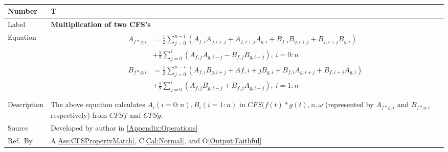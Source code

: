 \documentclass[12pt]{article}
\newcommand{\colAwidth}{0.13\textwidth}
\newcommand{\colBwidth}{0.82\textwidth}
\newcounter{theorynum} %
\newcommand{\aref}[1]{A\ref{#1}}
\newcommand{\calref}[1]{C\ref{#1}}
\newcommand{\oref}[1]{O\ref{#1}}
\begin{document}
~\newline
\noindent
\begin{minipage}{\textwidth}
	\renewcommand*{\arraystretch}{1.5}
	\begin{tabular}{| p{\colAwidth} | p{\colBwidth}|}
		\hline
		\rowcolor[gray]{0.9}
		Number& T{theorynum}\thetheorynum \label{T:Multiplication}\\
		\hline
		Label&\bf Multiplication of two CFS's\\
		\hline
		Equation&  
		\begin{equation}
		\begin{aligned}
		A_{f*g, i}
		&=\frac{1}{2}\sum_{j=0}^{n-i}(A_{f,i}A_{g,i+j}+A_{f, i+j}A_{g, i}+B_{f,i}B_{g,i+j}+B_{f,i+j}B_{g,i})\\&+\frac{1}{2}\sum_{j=0}^{i}(A_{f,j}A_{g,i-j}-B_{f,j}B_{g,i-j}),~i=0:n\\
		B_{f*g, i}
		&=\frac{1}{2}\sum_{j=0}^{n-i}(A_{f,i}B_{g,i+j}+A{f, i+j}B_{g, i}+B_{f,i}A_{g,i+j}+B_{f,i+j}A_{g,i})\\&+\frac{1}{2}\sum_{j=0}^{i}(A_{f,j}B_{g,i-j}+B_{f,j}A_{g,i-j}),~i=1:n\\
		\end{aligned}
		\end{equation}\\
		\hline
		Description & The above equation calculates $A_i (i=0:n), B_i(i=1:n)$ in $\mathit{CFS(f(t)*g(t), n, \omega}$  (represented by $A_{f*g, i}$ and $B_{f*g, i}$ respectively) from $\mathit{CFSf}$ and $\mathit{CFSg}$.\\
		
		\hline
		Source & Developed by author in \autoref{Appendix:Operations}\\
		\hline
		Ref.\ By & \aref{Ass:CFSPropertyMatch}, \calref{Cal:Normal}, and \oref{Output:Faithful}\\
		\hline
	\end{tabular}
\end{minipage}\\
\end{document}
